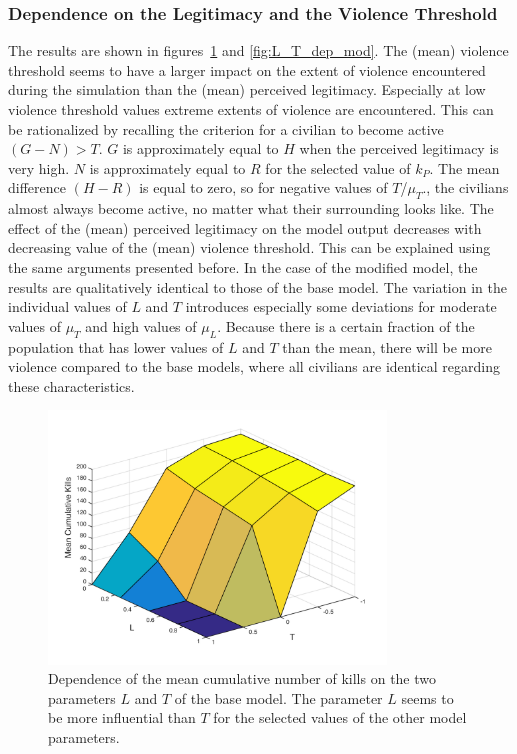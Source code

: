 \documentclass[11pt]{article}
\begin{document}
\subsubsection{Dependence on the Legitimacy and the Violence Threshold}
The results are shown in figures~\ref{fig:L_T_dep_base} and \ref{fig:L_T_dep_mod}. The (mean) violence threshold seems to have a larger impact on the extent of violence encountered during the simulation than the (mean) perceived legitimacy. Especially at low violence threshold values extreme extents of violence are encountered. This can be rationalized by recalling the criterion for a civilian to become active $(G-N)>T$. $G$ is approximately equal to $H$ when the perceived legitimacy is very high. $N$ is approximately equal to $R$ for the selected value of $k_P$. The mean difference $(H-R)$ is equal to zero, so for negative values of $T$/$\mu_T$., the civilians almost always become active, no matter what their surrounding looks like. The effect of the (mean) perceived legitimacy on the model output decreases with decreasing value of the (mean) violence threshold. This can be explained using the same arguments presented before. In the case of the modified model, the results are qualitatively identical to those of the base model. The variation in the individual values of $L$ and $T$ introduces especially some deviations for moderate values of $\mu_T$ and high values of $\mu_L$. Because there is a certain fraction of the population that has lower values of $L$ and $T$ than the mean, there will be more violence compared to the base models, where all civilians are identical regarding these characteristics.
\begin{figure}[!htbp]
	\centering
		\includegraphics[width=0.80\textwidth]{../../code/base_model/L_T_dep_mean.png}
	\caption{Dependence of the mean cumulative number of kills on the two parameters $L$ and $T$ of the base model. The parameter $L$ seems to be more influential than $T$ for the selected values of the other model parameters.}
	\label{fig:L_T_dep_base}
\end{figure}
\end{document}
